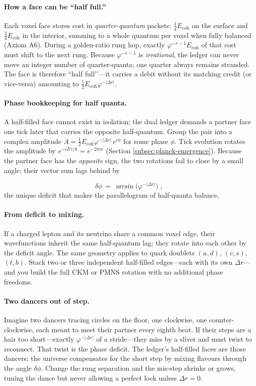 \documentclass[11pt]{article}
\begin{document}
\paragraph{How a face can be “half full.”}
Each voxel face stores cost in \emph{quarter-quantum} packets:  
\( \tfrac14 E_{\text{coh}} \) on the surface and \( \tfrac34 E_{\text{coh}} \) in the interior, summing to a whole quantum per voxel when fully balanced (Axiom A6).  
During a golden-ratio rung hop, exactly \( \varphi^{-r-1} E_{\text{coh}} \) of that cost must shift to the next rung.  
Because \( \varphi^{-r-1} \) is \emph{irrational}, the ledger can never move an integer number of quarter-quanta; one quarter always remains stranded.  
The face is therefore “half full’’—it carries a debit without its matching credit (or vice-versa) amounting to \( \tfrac12 E_{\text{coh}}\varphi^{-|{\Delta r}|}\).

\paragraph{Phase bookkeeping for half quanta.}
A half-filled face cannot exist in isolation; the dual ledger demands a partner face one tick later that carries the opposite half-quantum.  
Group the pair into a complex amplitude
\(
A = \tfrac12 E_{\text{coh}}\varphi^{-|{\Delta r}|}\,e^{i\phi}
\)
for some phase $\phi$.  
Tick evolution rotates the amplitude by
\(
e^{-iE\tau/\hbar}=e^{-2\pi i r}
\)
(Section \ref{subsec:planck-emergence}).  
Because the partner face has the \emph{opposite} sign, the two rotations
fail to close by a small angle; their vector sum lags behind by

\[
\boxed{\;
\delta\phi
\,=\,
\arcsin\!\bigl(\varphi^{-|{\Delta r}|}\bigr)
\;} ,
\]
the unique deficit that makes the parallelogram of half-quanta balance.

\paragraph{From deficit to mixing.}
If a charged lepton and its neutrino share a common voxel edge, their
wavefunctions inherit the same half-quantum lag; they rotate into each
other by the deficit angle.  The same geometry applies to quark doublets
\((u,d)\), \((c,s)\), \((t,b)\).  Stack two or three independent
half-filled edges—each with its own \(\Delta r\)—and you build the full
CKM or PMNS rotation with no additional phase freedoms.

\paragraph{Two dancers out of step.}
Imagine two dancers tracing circles on the floor, one clockwise, one
counter-clockwise, each meant to meet their partner every eighth beat.
If their steps are a hair too short—exactly
\(\varphi^{-|{\Delta r}|}\) of a stride—they miss by a sliver and must
twist to reconnect.  That twist is the phase deficit.  The ledger’s
half-filled faces are those dancers; the universe compensates for the
short step by mixing flavours through the angle \(\delta\phi\).  Change
the rung separation and the mis-step shrinks or grows, tuning the dance
but never allowing a perfect lock unless \(\Delta r=0\).
\end{document}
